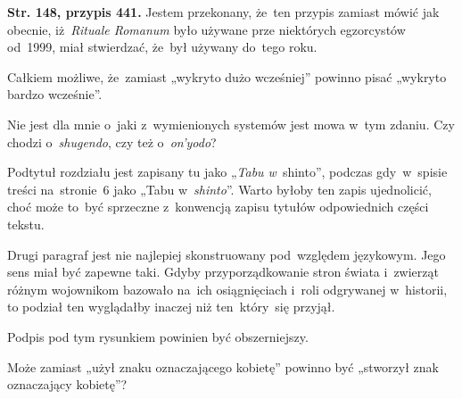 \documentclass[a4paper,11pt]{article}
\begin{document}
\vspace{\spaceFour}



\start \textbf{Str. 148, przypis 441.} Jestem przekonany, że~ten przypis
zamiast mówić jak obecnie, iż~\emph{Rituale Romanum} było używane prze
niektórych egzorcystów od~1999, miał stwierdzać, że~był używany
do~tego roku.

\vspace{\spaceFour}



\start {} Całkiem możliwe, że~zamiast „wykryto dużo
wcześniej” powinno pisać „wykryto bardzo wcześnie”.

\vspace{\spaceFour}



\start {} Nie jest dla mnie o~jaki z~wymienionych systemów
jest mowa w~tym zdaniu. Czy chodzi o~\emph{shugendo}, %
czy też o~\emph{on'yodo}? %

\vspace{\spaceFour}



\start {} Podtytuł rozdziału jest zapisany tu jako „\emph{Tabu
  w}~shinto”, %
podczas gdy~w~spisie treści na~stronie~6 jako „Tabu
w~\emph{shinto}”. %
Warto byłoby ten zapis ujednolicić, choć może to~być sprzeczne
z~konwencją zapisu tytułów odpowiednich części tekstu.

\vspace{\spaceFour}



\start {} Drugi paragraf jest nie najlepiej skonstruowany
pod~względem językowym. Jego sens miał być zapewne taki. Gdyby
przyporządkowanie stron świata i~zwierząt różnym wojownikom bazowało
na~ich osiągnięciach i~roli odgrywanej w~historii, to podział ten
wyglądałby inaczej niż ten~który~się przyjął.

\vspace{\spaceFour}



\start {} Podpis pod tym rysunkiem powinien być obszerniejszy.

\vspace{\spaceFour}



\start {} Może zamiast „użył znaku oznaczającego
kobietę” powinno być „stworzył znak oznaczający kobietę”?
\end{document}
